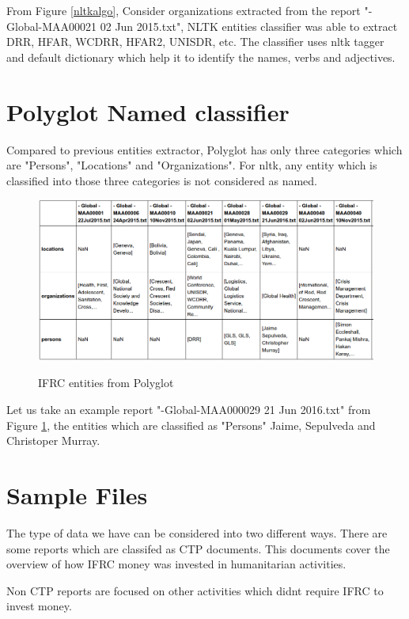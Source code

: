 From Figure \ref{nltkalgo}, Consider organizations extracted from the report "-Global-MAA00021 02 Jun 2015.txt", NLTK entities classifier was able to extract DRR, HFAR, WCDRR, HFAR2, UNISDR, etc. The classifier uses nltk tagger and default dictionary which help it to identify the names, verbs and adjectives.

\section{Polyglot Named classifier}

Compared to previous entities extractor, Polyglot has only three categories which are "Persons", "Locations" and "Organizations". For nltk, any entity which is classified into those three categories is not considered as named.

\begin{figure}[hbtp]
\caption{IFRC entities from Polyglot}
\centering
\includegraphics[scale=.45]{images/polyglot.png}\label{polyglot}
\end{figure}


Let us take an example report "-Global-MAA000029 21 Jun 2016.txt" from Figure \ref{polyglot}, the entities which are classified as "Persons" Jaime, Sepulveda and  Christoper Murray.



\section{Sample Files} 
The type of data we have can be considered into two different ways. There are some reports which are classifed as CTP documents. This documents cover the overview of how IFRC money was invested in humanitarian activities.

Non CTP reports are focused on other activities which didnt require IFRC to invest money. 

